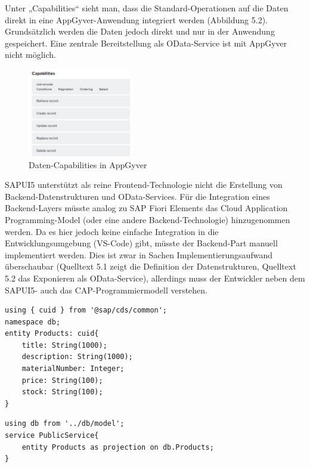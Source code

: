 Unter „Capabilities“ sieht man, dass die Standard-Operationen auf die Daten direkt in eine AppGyver-Anwendung integriert werden (Abbildung 5.2). Grundsätzlich werden die Daten jedoch direkt und nur in der Anwendung gespeichert. Eine zentrale Bereitstellung als OData-Service ist mit AppGyver nicht möglich.

\begin{figure}[!htbp]
 \centering
 \includegraphics[width=0.4\textwidth]{Bilder/appgyver/5_2_Capabilities.jpg}
 \caption{Daten-Capabilities in AppGyver}
\end{figure}

SAPUI5 unterstützt als reine Frontend-Technologie nicht die Erstellung von Backend-Datenstrukturen und OData-Services. Für die Integration eines Backend-Layers müsste analog zu SAP Fiori Elements das Cloud Application Programming-Model (oder eine andere Backend-Technologie) hinzugenommen werden. Da es hier jedoch keine einfache Integration in die Entwicklungsumgebung (VS-Code) gibt, müsste der Backend-Part manuell implementiert werden. Dies ist zwar in Sachen Implementierungsaufwand überschaubar (Quelltext 5.1 zeigt die Definition der Datenstrukturen, Quelltext 5.2 das Exponieren als OData-Service), allerdings muss der Entwickler neben dem SAPUI5- auch das CAP-Programmiermodell verstehen.

\begin{lstlisting}[emph={using, entity, Products, title, description, materialNumber, price, stock, String},  caption=Datenmodellierung in der \texttt{model.cds}]
using { cuid } from '@sap/cds/common';
namespace db;
entity Products: cuid{
    title: String(1000);
    description: String(1000);
    materialNumber: Integer;
    price: String(100);
    stock: String(100);
}
\end{lstlisting}
\begin{lstlisting}[emph={using, entity, db, Products},  caption=Service Bereitstellung in der \texttt{public\_service.cds}]
using db from '../db/model';
service PublicService{
    entity Products as projection on db.Products;
}
\end{lstlisting}

